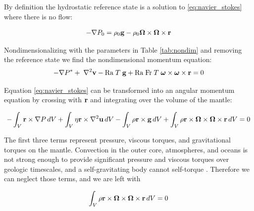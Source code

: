 \documentclass[extra,mreferee]{gji}
\begin{document}
By definition the hydrostatic reference state is a solution to \eqref{eq:navier_stokes} where there is no flow:

\begin{equation}
\begin{aligned}
- \nabla P_0 =  \rho_0 {\bf g} -  \rho_0 {\bf \Omega \times \Omega \times r}
\label{eq:hydrostatic}
\end{aligned}
\end{equation}

Nondimensionalizing with the parameters in Table \ref{tab:nondim} and removing the reference state we find the nondimensional momentum equation:
\begin{equation}
\begin{aligned}
 - \nabla P^* + \; \nabla^2{\bf v} - \mathrm{Ra} \; T \; {\bf g} + \mathrm{Ra \; Fr}\; T \;{\mitbf{\omega} \times \mitbf{\omega} \times {\bf r}} = 0
\end{aligned}
\end{equation}

Equation \eqref{eq:navier_stokes} can be transformed into an angular momentum equation by crossing with $\bf r$ and integrating over the volume of the mantle:

\begin{equation}
\begin{aligned}
-\int_V {\bf r} \times \nabla P \,dV + \int_V \eta {\bf r} \times \nabla^2 {\bf u} \,dV - \int_V \rho {\bf r \times g} \,dV 
   + \int_V \rho {\bf r \times \mitbf{\Omega} \times \mitbf{\Omega} \times {\bf r }} \,dV &= 0 \\
\end{aligned}
\end{equation}


The first three terms represent pressure, viscous torques, and gravitational torques on the mantle.  
Convection in the outer core, atmospheres, and oceans is not strong enough to provide significant pressure and viscous torques over geologic timescales, and a self-gravitating body cannot self-torque \citep{braginsky1995equations}.
Therefore we can neglect those terms, and we are left with

\begin{equation}
\begin{aligned}
\int_V \rho {\bf r \times \mitbf{\Omega} \times \mitbf{\Omega} \times {\bf r }} \,dV &= 0 \\
\end{aligned}
\end{equation}
\end{document}

